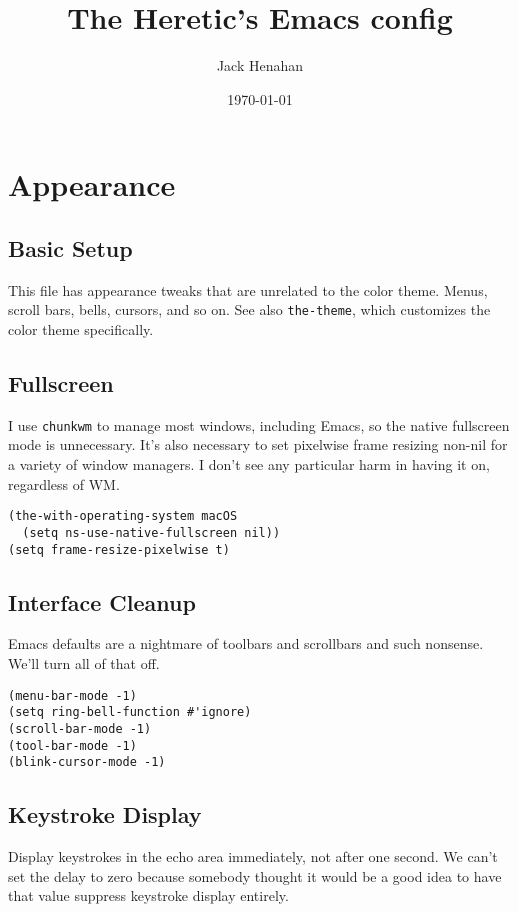 \documentclass[11pt]{article}
\author{Jack Henahan}
\date{\today}
\title{The Heretic's Emacs config}
\begin{document}
\maketitle
\tableofcontents


\section{Appearance}
\label{sec:org4445b0c}
\subsection{Basic Setup}
\label{sec:org34c87b2}
This file has appearance tweaks that are unrelated to the color
theme. Menus, scroll bars, bells, cursors, and so on. See also
\texttt{the-theme}, which customizes the color theme specifically.

\subsection{Fullscreen}
\label{sec:org90428d1}
I use \texttt{chunkwm} to manage most windows, including Emacs, so the native
fullscreen mode is unnecessary. It's also necessary to set pixelwise
frame resizing non-nil for a variety of window managers. I don't see
any particular harm in having it on, regardless of WM.

\begin{verbatim}
(the-with-operating-system macOS
  (setq ns-use-native-fullscreen nil))
(setq frame-resize-pixelwise t)
\end{verbatim}

\subsection{Interface Cleanup}
\label{sec:orgd06f8a5}
Emacs defaults are a nightmare of toolbars and scrollbars and such
nonsense. We'll turn all of that off.

\begin{verbatim}
(menu-bar-mode -1)
(setq ring-bell-function #'ignore)
(scroll-bar-mode -1)
(tool-bar-mode -1)
(blink-cursor-mode -1)
\end{verbatim}

\subsection{Keystroke Display}
\label{sec:orge73894c}
Display keystrokes in the echo area immediately, not after one
second. We can't set the delay to zero because somebody thought it
would be a good idea to have that value suppress keystroke display
entirely.
\end{document}
